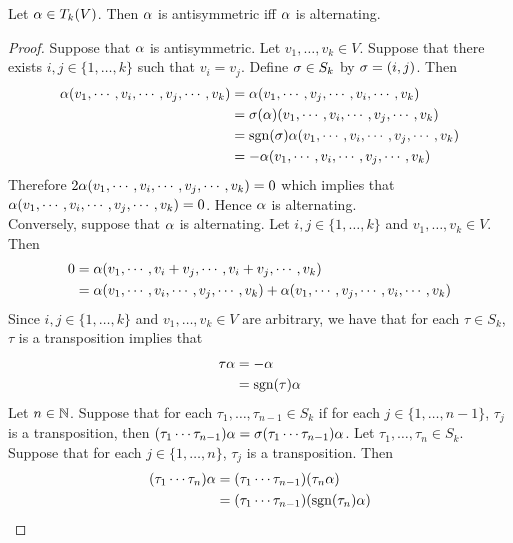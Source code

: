 \documentclass{book}
\begin{document}
	\begin{ex}
		Let $\alpha \in T_k(V)$. Then $\alpha$ is antisymmetric iff $\alpha$ is alternating.
	\end{ex}

	\begin{proof}
		Suppose that $\alpha$ is antisymmetric. Let $v_1, \ldots, v_k \in V$. Suppose that there exists $i,j \in \{1, \ldots, k\}$ such that $v_i = v_j$. Define $\sigma \in S_k$ by $\sigma = (i,j)$. Then 
		\begin{align*}
			\alpha (v_1, \cdots, v_i, \cdots, v_j, \cdots,  v_k)  
			& = \alpha (v_1, \cdots, v_j, \cdots, v_i, \cdots,  v_k)  \\
			& = \sigma(\alpha) (v_1, \cdots, v_i, \cdots, v_j, \cdots,  v_k) \\
			& = \operatorname{sgn}(\sigma)\alpha (v_1, \cdots, v_i, \cdots, v_j, \cdots,  v_k) \\
			& = -\alpha (v_1, \cdots, v_i, \cdots, v_j, \cdots,  v_k) 
		\end{align*} 
		Therefore $2 \alpha (v_1, \cdots, v_i, \cdots, v_j, \cdots,  v_k) = 0$ which implies that $\alpha (v_1, \cdots, v_i, \cdots, v_j, \cdots,  v_k) = 0$. Hence $\alpha$ is alternating. \\
		Conversely, suppose that $\alpha$ is alternating. Let $i,j \in \{1, \ldots, k\}$ and $v_1, \ldots, v_k \in V$. Then 
		\begin{align*}
			0 
			& = \alpha(v_1, \cdots, v_i + v_j, \cdots, v_i + v_j, \cdots,  v_k) \\
			& = \alpha(v_1, \cdots, v_i, \cdots, v_j, \cdots,  v_k) + \alpha(v_1, \cdots, v_j, \cdots, v_i, \cdots,  v_k)
		\end{align*}
		Since $i,j \in \{1, \ldots, k\}$ and $v_1, \ldots, v_k \in V$ are arbitrary, we have that for each $\tau \in S_k$, $\tau$ is a transposition implies that
		\begin{align*}
			\tau \alpha
			& = - \alpha \\
			& = \operatorname{sgn}(\tau) \alpha
		\end{align*}
		Let $n \in \mathbb{N}$. Suppose that for each $\tau_1, \ldots, \tau_{n-1} \in S_k$ if for each $j \in \{1, \ldots, n-1\}$, $\tau_j$ is a transposition, then $(\tau_1 \cdots \tau_{n-1}) \alpha = \sigma(\tau_1 \cdots \tau_{n-1}) \alpha$. Let $\tau_1, \ldots, \tau_n \in S_k$. Suppose that for each $j \in \{1, \ldots, n\}$, $\tau_j$ is a transposition.
		Then 
		\begin{align*}
			(\tau_1 \cdots \tau_n) \al 
			& = (\tau_1 \cdots \tau_{n-1}) (\tau_n \al) \\
			& = (\tau_1 \cdots \tau_{n-1}) (\sgn(\tau_n ) \al) \\

\end{align*}
\end{proof}
\end{document}
